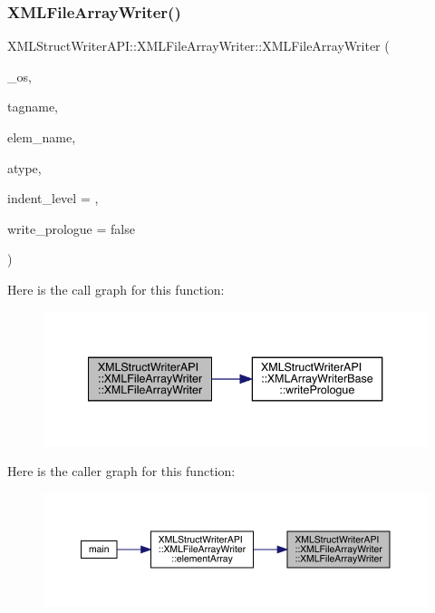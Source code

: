 \subsubsection{\texorpdfstring{XMLFileArrayWriter()}{XMLFileArrayWriter()}\hspace{0.1cm}{\footnotesize\ttfamily [1/2]}}
{\footnotesize\ttfamily X\+M\+L\+Struct\+Writer\+A\+P\+I\+::\+X\+M\+L\+File\+Array\+Writer\+::\+X\+M\+L\+File\+Array\+Writer (\begin{DoxyParamCaption}\item[{std\+::ofstream \&}]{\+\_\+os,  }\item[{const std\+::string \&}]{tagname,  }\item[{const std\+::string \&}]{elem\+\_\+name,  }\item[{\mbox{\hyperlink{namespaceXMLStructWriterAPI_a2017208be87c77a32bdc19ea2f14d032}{Array\+Type}}}]{atype,  }\item[{int}]{indent\+\_\+level = {},  }\item[{bool}]{write\+\_\+prologue = {\ttfamily false} }\end{DoxyParamCaption})\hspace{0.3cm}{\ttfamily [inline]}}

Here is the call graph for this function\+:
\nopagebreak
\begin{figure}[H]
\begin{center}
\leavevmode
\includegraphics[width=340pt]{d1/d9d/classXMLStructWriterAPI_1_1XMLFileArrayWriter_ab4591c76da7c7db03abe6a3e4cf0529a_cgraph}
\end{center}
\end{figure}
Here is the caller graph for this function\+:\nopagebreak
\begin{figure}[H]
\begin{center}
\leavevmode
\includegraphics[width=350pt]{d1/d9d/classXMLStructWriterAPI_1_1XMLFileArrayWriter_ab4591c76da7c7db03abe6a3e4cf0529a_icgraph}
\end{center}
\end{figure}
\mbox{\label{classXMLStructWriterAPI_1_1XMLFileArrayWriter_acfdbf7c2c12e6cbed700fb0fc48977e7}} 
